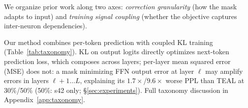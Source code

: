 We organize prior work along two axes: \emph{correction granularity} (how the mask adapts to input) and \emph{training signal coupling} (whether the objective captures inter-neuron dependencies).

\begin{table}[t]
\centering
\caption{Taxonomy of learned sparsity prediction methods along correction granularity (rows) and training signal coupling (columns). Our method occupies the Per-token $\times$ Coupled cell (organizational framework). Empty cells represent unexplored combinations; their relative merit is an open question.}
\label{tab:taxonomy}
\end{table}

Our method combines per-token prediction with coupled KL training (Table~\ref{tab:taxonomy}).
KL on output logits directly optimizes next-token prediction loss, which composes across layers; per-layer mean squared error (MSE) does not: a mask minimizing FFN output error at layer $\ell$ may amplify errors in layers $\ell{+}1 \ldots L$, explaining its $1.7\times$/$9.6\times$ worse PPL than TEAL at 30\%/50\% (50\%: s42 only; \S\ref{sec:experiments}). %
Full taxonomy discussion in Appendix~\ref{app:taxonomy}.

